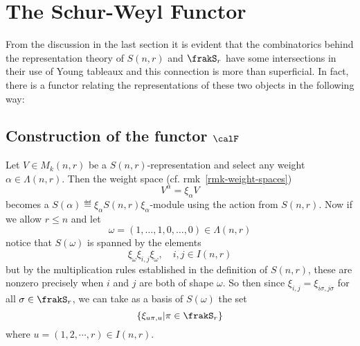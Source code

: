 \documentclass[12pt]{article}
\begin{document}


\newpage
\section{The Schur-Weyl Functor}
From the discussion in the last section it is evident that the combinatorics behind the representation theory of $S(n,r)$ and $\frakS_r$ have some intersections
in their use of Young tableaux and this connection is more than superficial. In fact, there is a functor relating the representations
of these two objects in the following way:
\subsection{Construction of the functor \texorpdfstring{$\calF$}{F}}

Let $V\in M_k(n,r)$ be a $S(n,r)$-representation and select any weight $\alpha\in\Lambda(n,r)$. Then the weight space (cf. rmk~\ref{rmk-weight-spaces})
\[V^\alpha=\xi_\alpha V\]
becomes a $S(\alpha)\eqdef\xi_\alpha S(n,r)\xi_\alpha$-module using the action from $S(n,r)$. Now if we allow $r\le n$ and let
\[\omega=(1,\dots,1,0,\dots,0)\in\Lambda(n,r)\]
notice that $S(\omega)$ is spanned by the elements
\[\xi_\omega\xi_{i,j}\xi_\omega,\quad i,j\in I(n,r)\]
but by the multiplication rules established in the definition of $S(n,r)$, these are nonzero precisely when 
$i$ and $j$ are both of shape $\omega$. So then since $\xi_{i,j}=\xi_{i\sigma,j\sigma}$ for all $\sigma\in\frakS_r$, we can take as
a basis of $S(\omega)$ the set 
\[\{\xi_{u\pi,u}|\pi\in\frakS_r\}\]
where $u=(1,2,\cdots,r)\in I(n,r)$.
\end{document}
